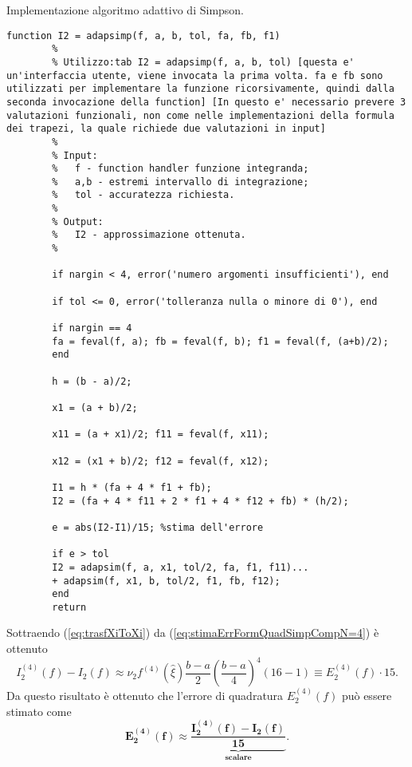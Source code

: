 \begin{algorithm}\caption{Implementazione algoritmo adattivo di Simpson.}
	\label{alg:formula_simpson_adattiva}
	\begin{lstlisting}[style=Matlab-editor]
		function I2 = adapsimp(f, a, b, tol, fa, fb, f1)
		%
		% Utilizzo:tab I2 = adapsimp(f, a, b, tol) [questa e' un'interfaccia utente, viene invocata la prima volta. fa e fb sono utilizzati per implementare la funzione ricorsivamente, quindi dalla seconda invocazione della function] [In questo e' necessario prevere 3 valutazioni funzionali, non come nelle implementazioni della formula dei trapezi, la quale richiede due valutazioni in input]
		%
		% Input:
		%   f - function handler funzione integranda;
		%   a,b - estremi intervallo di integrazione;
		%   tol - accuratezza richiesta.
		%
		% Output:
		%   I2 - approssimazione ottenuta.
		%
		
		if nargin < 4, error('numero argomenti insufficienti'), end
		
		if tol <= 0, error('tolleranza nulla o minore di 0'), end 
		
		if nargin == 4
		fa = feval(f, a); fb = feval(f, b); f1 = feval(f, (a+b)/2);
		end
		
		h = (b - a)/2;
		
		x1 = (a + b)/2;
		
		x11 = (a + x1)/2; f11 = feval(f, x11);
		
		x12 = (x1 + b)/2; f12 = feval(f, x12);
		
		I1 = h * (fa + 4 * f1 + fb); 
		I2 = (fa + 4 * f11 + 2 * f1 + 4 * f12 + fb) * (h/2);
		
		e = abs(I2-I1)/15; %stima dell'errore
		
		if e > tol
		I2 = adapsim(f, a, x1, tol/2, fa, f1, f11)...
		+ adapsim(f, x1, b, tol/2, f1, fb, f12); 
		end
		return
	\end{lstlisting}
\end{algorithm}

Sottraendo (\ref{eq:trasfXiToXi}) da (\ref{eq:stimaErrFormQuadSimpCompN=4}) è ottenuto
\begin{equation*}
    I_2^{(4)}(f)-I_2(f)\approx\nu_2 f^{(4)}(\widehat\xi)\frac{b-a}{2}\left(\frac{b-a}{4}\right)^4(16-1)\equiv E_2^{(4)}(f)\cdot 15.
\end{equation*}
Da questo risultato è ottenuto che l'errore di quadratura $E_2^{(4)}(f)$ può essere stimato come
\begin{equation}
    \boldsymbol{E_2^{(4)}(f)\approx\underbrace{\frac{I_2^{(4)}(f)-I_2(f)}{15}}_{\text{scalare}}}.
\end{equation}

